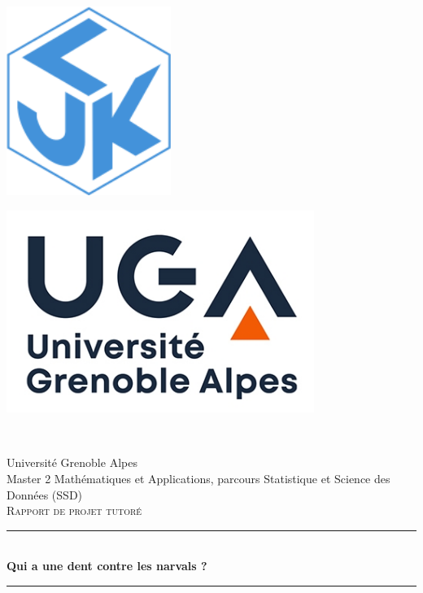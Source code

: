 
\begin{titlepage}
	\begin{minipage}{0.5\textwidth}
		\begin{flushleft}
		    \includegraphics[width=0.4\textwidth]{images/logo_ljk.png}
		\end{flushleft}
	\end{minipage}
	\begin{minipage}{0.5\textwidth}
        \begin{flushright}
            \includegraphics[width=0.75\textwidth]{images/logo_uga.jpeg}
		\end{flushright}
	\end{minipage}\\[1.5 cm]

    \begin{center}
        {\Large Université Grenoble Alpes\\[.5 cm]
        Master 2 Mathématiques et Applications, parcours Statistique et Science des Données (SSD)}\\[1.5 cm]

        \textsc{\LARGE Rapport de projet tutoré}

	    \rule{\linewidth}{0.2 mm} \\[1 cm]
	    {\huge \bfseries Qui a une dent contre les narvals ?}\\[.7 cm]
	    \rule{\linewidth}{0.2 mm} \\[1.5 cm]


\end{center}
\end{titlepage}
